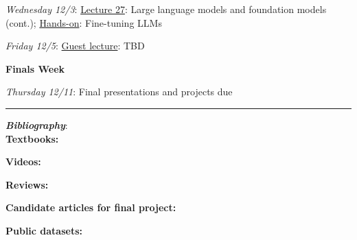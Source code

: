 \documentclass[12pt]{article}
\begin{document}
\emph{Wednesday 12/3}: \underline{Lecture 27}: Large language models and foundation models (cont.); \underline{Hands-on}: Fine-tuning LLMs

\emph{Friday 12/5}: \underline{Guest lecture}: TBD

\noindent\textbf{Finals Week}

\emph{Thursday 12/11}: Final presentations and projects due

\begin{center}
	\rule{\textwidth}{0.5pt}
\end{center}

\noindent\textbf{\emph{Bibliography}}:\\

\textbf{Textbooks:}

\newrefsection
\nocite{Mehta:2019,Abu-Mostafa:2012,Erdman:2021,Zeljko:2014,Calafiura:2022,Chollet:2021,Goodfellow-et-al-2016}
\printbibliography[heading=none]

\textbf{Videos:}

\newrefsection
\nocite{3blue1brown_neuralnetwork,3blue1brown_gradientdescent}
\printbibliography[heading=none]

\textbf{Reviews:}

\newrefsection
\nocite{Carleo:2019ptp,hepmllivingreview,ParticleDataGroup:2024cfk}
\printbibliography[heading=none]

\textbf{Candidate articles for final project:}

\newrefsection
\nocite{deOliveira:2015xxd,Aurisano:2016jvx,Komiske:2016rsd,Khan:2018opv,Zhou:2019,Moreno:2019neq,Ormiston:2020ele,Moreno:2021fvp,Erdmann:2019nie,Guest:2016iqz,Majorana:2023kmv,Fry:2024lcg,Miao:2024oqy,Li:2024htp,LSSTDarkEnergyScience:2019cvx}
\printbibliography[heading=none]

\textbf{Public datasets:}

\newrefsection
\nocite{kasieczka_gregor_2019_2603256,hbb_dataset,galaxy-zoo-the-galaxy-challenge,g2net-gravitational-wave-detection,trackml-particle-identification,majorana_collaboration_2023_8257027,jetclass,jetclass2,plasticc-kaggle}
\printbibliography[heading=none]
\end{document}
